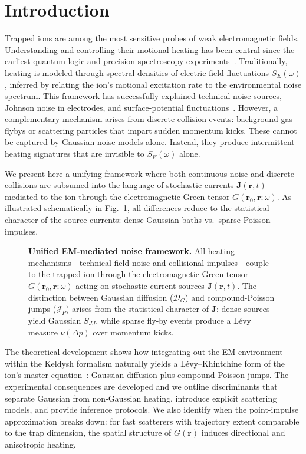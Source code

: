 \section{Introduction}
Trapped ions are among the most sensitive probes of weak electromagnetic fields.
Understanding and controlling their motional heating has been central since the earliest quantum logic and precision spectroscopy experiments~\cite{Turchette2000,Wineland1998}.
Traditionally, heating is modeled through spectral densities of electric field fluctuations $S_E(\omega)$, inferred by relating the ion's motional excitation rate to the environmental noise spectrum.
This framework has successfully explained technical noise sources, Johnson noise in electrodes, and surface-potential fluctuations~\cite{Brownnutt2015}.
However, a complementary mechanism arises from discrete collision events: background gas flybys or scattering particles that impart sudden momentum kicks.
These cannot be captured by Gaussian noise models alone.
Instead, they produce intermittent heating signatures that are invisible to $S_E(\omega)$ alone.

We present here a unifying framework where both continuous noise and discrete collisions are subsumed into the language of stochastic currents $\mathbf{J}(\mathbf{r},t)$ mediated to the ion through the electromagnetic Green tensor $G(\mathbf{r}_0,\mathbf{r};\omega)$.
As illustrated schematically in Fig.~\ref{fig:em_mediation}, all differences reduce to the statistical character of the source currents: dense Gaussian baths vs.~sparse Poisson impulses.

\begin{figure}[t]
  \centering
  
  \caption{\textbf{Unified EM-mediated noise framework.}
  All heating mechanisms—technical field noise and collisional impulses—couple to the trapped ion through the electromagnetic Green tensor $G(\mathbf{r}_0,\mathbf{r};\omega)$ acting on stochastic current sources $\mathbf{J}(\mathbf{r},t)$.
  The distinction between Gaussian diffusion ($\mathcal{D}_G$) and compound-Poisson jumps ($\mathcal{J}_P$) arises from the statistical character of $\mathbf{J}$: dense sources yield Gaussian $S_{JJ}$, while sparse fly-by events produce a Lévy measure $\nu(\Delta p)$ over momentum kicks.}
  \label{fig:em_mediation}
\end{figure}

The theoretical development shows how integrating out the EM environment within the Keldysh formalism naturally yields a Lévy–Khintchine form of the ion's master equation~\cite{Sornette2006}: Gaussian diffusion plus compound-Poisson jumps.
The experimental consequences are developed and we outline discriminants that separate Gaussian from non-Gaussian heating, introduce explicit scattering models, and provide inference protocols.
We also identify when the point-impulse approximation breaks down: for fast scatterers with trajectory extent comparable to the trap dimension, the spatial structure of $G(\mathbf{r})$ induces directional and anisotropic heating.
